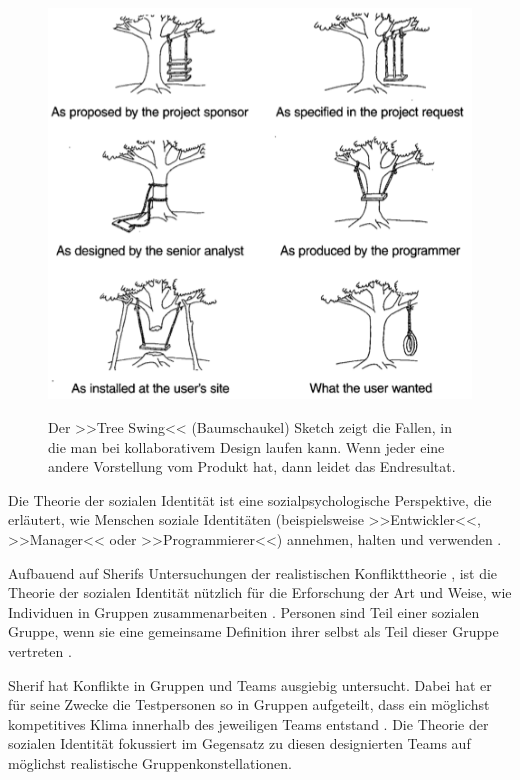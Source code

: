 \begin{figure}
	{\includegraphics[width=1\linewidth]{gfx/kilkerTreeSwing}}
\caption[Tree Swing Sketch \newline \citep{Kilker:1999}]{Der >>Tree Swing<< (Baumschaukel) Sketch zeigt die Fallen, in die man bei kollaborativem Design laufen kann. Wenn jeder eine andere Vorstellung vom Produkt hat, dann leidet das Endresultat.}\label{fig:kilkerTree}
\end{figure}

\medskip Die Theorie der sozialen Identität ist eine sozialpsychologische Perspektive, die erläutert, wie Menschen soziale Identitäten (beispielsweise >>Entwickler<<, >>Manager<< oder >>Programmierer<<) annehmen, halten und verwenden \citep{Hogg:1988}.

Aufbauend auf Sherifs Untersuchungen der realistischen Konflikttheorie \citep{Sherif:1966}, ist die Theorie der sozialen Identität nützlich für die Erforschung der Art und Weise, wie Individuen in Gruppen zusammenarbeiten \citep{Kilker:1999}. Personen sind Teil einer sozialen Gruppe, wenn sie eine gemeinsame Definition ihrer selbst als Teil dieser Gruppe vertreten \citep{Hogg:1988}.

Sherif hat Konflikte in Gruppen und Teams ausgiebig untersucht. Dabei hat er für seine Zwecke die Testpersonen so in Gruppen aufgeteilt, dass ein möglichst kompetitives Klima innerhalb des jeweiligen Teams entstand \citep{Sherif:1966}. Die Theorie der sozialen Identität fokussiert im Gegensatz zu diesen designierten Teams auf möglichst realistische Gruppenkonstellationen.

